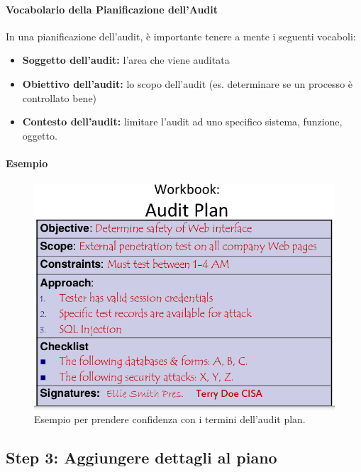 \paragraph{Vocabolario della Pianificazione dell'Audit}

In una pianificazione dell'audit, è importante tenere a mente i seguenti 
vocaboli:
\begin{itemize}
\item \textbf{Soggetto dell'audit:} l'area che viene auditata
\item \textbf{Obiettivo dell'audit:} lo scopo dell'audit (es. determinare se un processo 
è controllato bene)
\item \textbf{Contesto dell'audit:} limitare l'audit ad uno specifico sistema, funzione, 
oggetto.
\end{itemize}


\paragraph*{Esempio}

\begin{figure}[H]
	\begin{center}	
\includegraphics[scale=0.3]{res/img/audit_plan_vocabulary_example.png}
	\end{center}
	\caption{Esempio per prendere confidenza con i termini dell'audit plan.}
	\label{fig:audit:plan:vocabulary:example}
\end{figure}

\subsection{Step 3: Aggiungere dettagli al piano}

